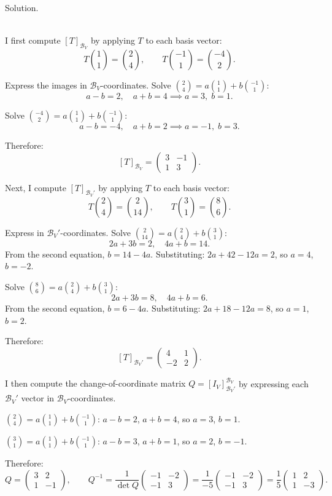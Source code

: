 \documentclass{article}
\begin{document}
\noindent\\
\textnormal{Solution.}\\
\quad\\
\begin{mdframed}[linewidth=1pt]
\textnormal{I first compute $[T]_{\mathcal{B}_V}$} by applying $T$ to each basis vector:
\[
T\binom{1}{1} = \binom{2}{4}, \qquad T\binom{-1}{1} = \binom{-4}{2}.
\]

Express the images in $\mathcal{B}_V$-coordinates. Solve $\binom{2}{4} = a\binom{1}{1} + b\binom{-1}{1}$:
\[
a - b = 2, \quad a + b = 4 \implies a = 3,\; b = 1.
\]

Solve $\binom{-4}{2} = a\binom{1}{1} + b\binom{-1}{1}$:
\[
a - b = -4, \quad a + b = 2 \implies a = -1,\; b = 3.
\]

Therefore:
\[
[T]_{\mathcal{B}_V} = \begin{pmatrix} 3 & -1 \\ 1 & 3 \end{pmatrix}.
\]

\medskip
\textnormal{Next, I compute $[T]_{\mathcal{B}_V'}$} by applying $T$ to each basis vector:
\[
T\binom{2}{4} = \binom{2}{14}, \qquad T\binom{3}{1} = \binom{8}{6}.
\]

Express in $\mathcal{B}_V'$-coordinates. Solve $\binom{2}{14} = a\binom{2}{4} + b\binom{3}{1}$:
\[
2a + 3b = 2, \quad 4a + b = 14.
\]
From the second equation, $b = 14 - 4a$. Substituting: $2a + 42 - 12a = 2$, so $a = 4$, $b = -2$.

Solve $\binom{8}{6} = a\binom{2}{4} + b\binom{3}{1}$:
\[
2a + 3b = 8, \quad 4a + b = 6.
\]
From the second equation, $b = 6 - 4a$. Substituting: $2a + 18 - 12a = 8$, so $a = 1$, $b = 2$.

Therefore:
\[
[T]_{\mathcal{B}_V'} = \begin{pmatrix} 4 & 1 \\ -2 & 2 \end{pmatrix}.
\]

\medskip
\textnormal{I then compute the change-of-coordinate matrix $Q = [I_V]_{\mathcal{B}_V'}^{\mathcal{B}_V}$} by expressing each $\mathcal{B}_V'$ vector in $\mathcal{B}_V$-coordinates.

$\binom{2}{4} = a\binom{1}{1} + b\binom{-1}{1}$: $a - b = 2$, $a + b = 4$, so $a = 3$, $b = 1$.

$\binom{3}{1} = a\binom{1}{1} + b\binom{-1}{1}$: $a - b = 3$, $a + b = 1$, so $a = 2$, $b = -1$.

Therefore:
\[
Q = \begin{pmatrix} 3 & 2 \\ 1 & -1 \end{pmatrix}, \qquad
Q^{-1} = \frac{1}{\det Q}\begin{pmatrix} -1 & -2 \\ -1 & 3 \end{pmatrix} = \frac{1}{-5}\begin{pmatrix} -1 & -2 \\ -1 & 3 \end{pmatrix} = \frac{1}{5}\begin{pmatrix} 1 & 2 \\ 1 & -3 \end{pmatrix}.
\]


\end{mdframed}
\end{document}
